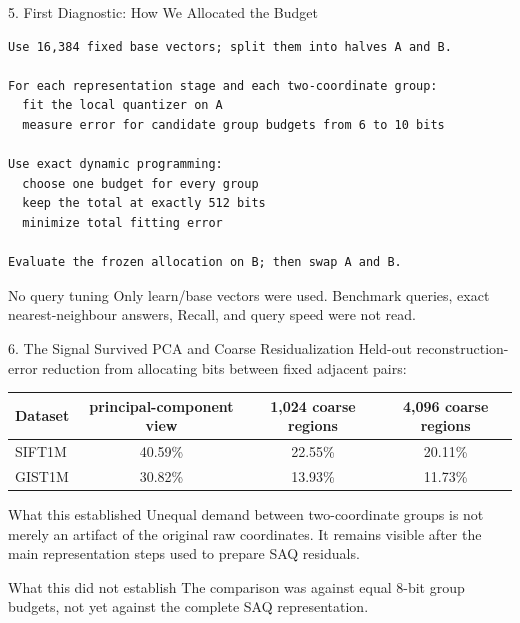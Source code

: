 \documentclass[aspectratio=169]{beamer}
\begin{document}
\begin{frame}[fragile]{5. First Diagnostic: How We Allocated the Budget}
\footnotesize
\begin{verbatim}
Use 16,384 fixed base vectors; split them into halves A and B.

For each representation stage and each two-coordinate group:
  fit the local quantizer on A
  measure error for candidate group budgets from 6 to 10 bits

Use exact dynamic programming:
  choose one budget for every group
  keep the total at exactly 512 bits
  minimize total fitting error

Evaluate the frozen allocation on B; then swap A and B.
\end{verbatim}
\begin{alertblock}{No query tuning}
Only learn/base vectors were used. Benchmark queries, exact nearest-neighbour
answers, Recall, and query speed were not read.
\end{alertblock}
\end{frame}

\begin{frame}{6. The Signal Survived PCA and Coarse Residualization}
\small
Held-out reconstruction-error reduction from allocating bits between fixed
adjacent pairs:
\begin{center}
\begin{tabular}{lccc}
\toprule
Dataset & principal-component view & 1,024 coarse regions & 4,096 coarse regions\\
\midrule
SIFT1M & 40.59\% & 22.55\% & 20.11\%\\
GIST1M & 30.82\% & 13.93\% & 11.73\%\\
\bottomrule
\end{tabular}
\end{center}
\begin{block}{What this established}
Unequal demand between two-coordinate groups is not merely an artifact of the
original raw coordinates. It remains visible after the main representation
steps used to prepare SAQ residuals.
\end{block}
\begin{alertblock}{What this did not establish}
The comparison was against equal 8-bit group budgets, not yet against the
complete SAQ representation.
\end{alertblock}
\end{frame}
\end{document}

